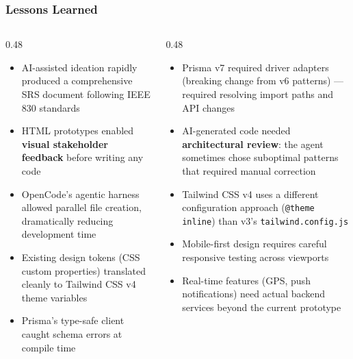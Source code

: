 \documentclass[aspectratio=169,professionalfonts,10pt]{beamer}
\begin{document}
\begin{frame}
    \frametitle{Lessons Learned}
    \small
    \begin{columns}[T]
        \begin{column}{0.48\textwidth}
            \begin{tcolorbox}[colback=green!5,colframe=green!60!black,title=\small What Worked Well]
                \scriptsize
                \begin{itemize}\setlength{\itemsep}{1pt}
                    \item AI-assisted ideation rapidly produced a comprehensive SRS document following IEEE 830 standards
                    \item HTML prototypes enabled \textbf{visual stakeholder feedback} before writing any code
                    \item OpenCode's agentic harness allowed parallel file creation, dramatically reducing development time
                    \item Existing design tokens (CSS custom properties) translated cleanly to Tailwind CSS v4 theme variables
                    \item Prisma's type-safe client caught schema errors at compile time
                \end{itemize}
            \end{tcolorbox}
        \end{column}

        \begin{column}{0.48\textwidth}
            \begin{tcolorbox}[colback=red!5,colframe=red!70!black,title=\small Challenges]
                \scriptsize
                \begin{itemize}\setlength{\itemsep}{1pt}
                    \item Prisma v7 required driver adapters (breaking change from v6 patterns) --- required resolving import paths and API changes
                    \item AI-generated code needed \textbf{architectural review}: the agent sometimes chose suboptimal patterns that required manual correction
                    \item Tailwind CSS v4 uses a different configuration approach (\texttt{@theme inline}) than v3's \texttt{tailwind.config.js}
                    \item Mobile-first design requires careful responsive testing across viewports
                    \item Real-time features (GPS, push notifications) need actual backend services beyond the current prototype
                \end{itemize}
            \end{tcolorbox}
        \end{column}
    \end{columns}
\end{frame}
\end{document}
